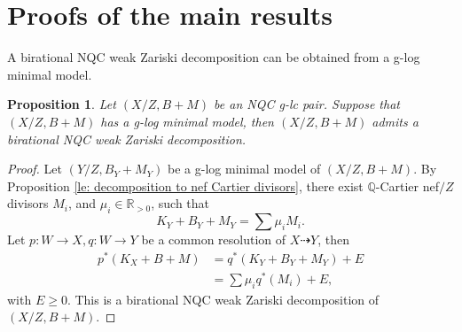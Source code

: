 \documentclass[11pt]{amsart}
\newcommand{\Rr}{\mathbb{R}}
\newcommand{\Qq}{\mathbb{Q}}
\newtheorem{proposition}[theorem]{Proposition}
\begin{document}
\begin{comment}
\begin{proposition}\label{prop:specialtersmall}
Let $(X,B+M)$ be a g-dlt pair with data $\tilde X \xrightarrow{f} X \to Z$ and $\tilde M$, where $\tilde M=\sum \mu_i \tilde M_i$, $\tilde M_i$ are nef$/Z$ Cartier divisors. Consider a sequence of log flips starting from $(X,B+M)=(X_0,B_0+M_0)$:
\[(X_0,B_0+M_0)\dashrightarrow (X_1,B_1+M_1)\dashrightarrow (X_2,B_2+M_2)\dashrightarrow ,\]
where $\phi_i: X_i\to Z_i$ is a contraction of an extremal ray $R_i$ with $(K_{X_i}+B_i+M_i)\cdot R_i<0$, and $\phi_{i}^{+}: X_i^{+}=X_{i+1}\to Z_i$ is the flip. Let $S_0$ be any component of $\lfloor B_0\rfloor$, $S_i$ be the birational transform of $S_0$ on $X_i$. Then after finitely many flips, $S_i$ are isomorphic to each other in codimension 1. 
\end{proposition}
The proof of Proposition \ref{prop:specialtersmall} use almost the same argument of special termination for dlt pairs (c.f. \cite{Fujino05}).
\begin{proof}
We note that the number of g-lc center is finite. If the flipping locus contains a g-lc center, then the number of g-lc centers decreases by negativity lemma. Moreover, by negativity lemma, we have $a(E,B_{S_i}+M_{S_i})\le a(E,B_{S_{i+1}}+M_{S_i})$. It is clear that  

Now, we assume that $\phi_i: X_i\dashrightarrow X_{i+1}$ induces an isomorphism of every $(d-1)$-dimensional g-lc center for every $i$. 
\end{proof}
\end{comment}

\section{Proofs of the main results}\label{sec: proof}

A birational NQC weak Zariski decomposition can be obtained from a g-log minimal model.

\begin{proposition}\label{prop: g-log minimal model implies NQC zarski decomposition}
	Let $(X/Z,B+M)$ be an NQC g-lc pair. Suppose that $(X/Z,B+M)$ has a g-log minimal model, then $(X/Z,B+M)$ admits a birational NQC weak Zariski decomposition. 
\end{proposition}
\begin{proof}
	Let $(Y/Z,B_Y+M_Y)$ be a g-log minimal model of $(X/Z,B+M)$. By Proposition \ref{le: decomposition to nef Cartier divisors}, there exist $\Qq$-Cartier nef$/Z$ divisors $M_i$, and $\mu_i\in\Rr_{>0}$, such that 
	\[
	K_{Y}+B_Y+M_Y=\sum \mu_i M_i.
	\]
	Let $p:W\to X,q:W\to Y$ be a common resolution of $X\dashrightarrow Y$, then
	\begin{align*}
	p^{*}(K_X+B+M)&=q^{*}(K_Y+B_Y+M_Y)+E\\
	&=\sum \mu_i q^{*}(M_i)+E,
	\end{align*} with $E \geq 0$. This is a birational NQC weak Zariski decomposition of $(X/Z,B+M)$.
\end{proof}
\end{document}
